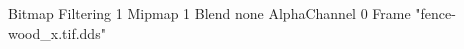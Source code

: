 {Bitmap
	{Filtering 1}
	{Mipmap 1}
	{Blend none}
	{AlphaChannel 0}
	{Frame "fence-wood_x.tif.dds"}
}
